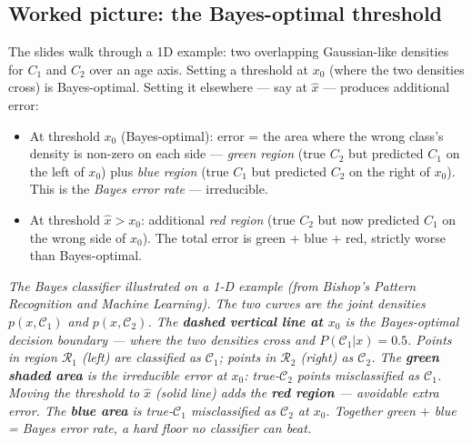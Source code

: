 \documentclass[11pt, a4paper]{article}
\begin{document}
\subsection{Worked picture: the Bayes-optimal threshold}

The slides walk through a 1D example: two overlapping Gaussian-like densities for $C_1$ and $C_2$ over an age axis. Setting a threshold at $x_0$ (where the two densities cross) is Bayes-optimal. Setting it elsewhere — say at $\hat{x}$ — produces additional error:

\begin{itemize}
  \item At threshold $x_0$ (Bayes-optimal): error = the area where the wrong class's density is non-zero on each side — \emph{green region} (true $C_2$ but predicted $C_1$ on the left of $x_0$) plus \emph{blue region} (true $C_1$ but predicted $C_2$ on the right of $x_0$). This is the \emph{Bayes error rate} — irreducible.
  \item At threshold $\hat{x} > x_0$: additional \emph{red region} (true $C_2$ but now predicted $C_1$ on the wrong side of $x_0$). The total error is green + blue + red, strictly worse than Bayes-optimal.
\end{itemize}

\begin{center}

\footnotesize\textit{The Bayes classifier illustrated on a 1-D example (from Bishop's \emph{Pattern Recognition and Machine Learning}). The two curves are the joint densities $p(x, \mathcal{C}_1)$ and $p(x, \mathcal{C}_2)$. The \textbf{dashed vertical line at $x_0$} is the Bayes-optimal decision boundary --- where the two densities cross and $P(\mathcal{C}_1|x)=0.5$. Points in region $\mathcal{R}_1$ (left) are classified as $\mathcal{C}_1$; points in $\mathcal{R}_2$ (right) as $\mathcal{C}_2$. The \textbf{green shaded area} is the irreducible error at $x_0$: true-$\mathcal{C}_2$ points misclassified as $\mathcal{C}_1$. Moving the threshold to $\hat{x}$ (solid line) adds the \textbf{red region} --- avoidable extra error. The \textbf{blue area} is true-$\mathcal{C}_1$ misclassified as $\mathcal{C}_2$ at $x_0$. Together green $+$ blue = Bayes error rate, a hard floor no classifier can beat.}
\end{center}
\end{document}
